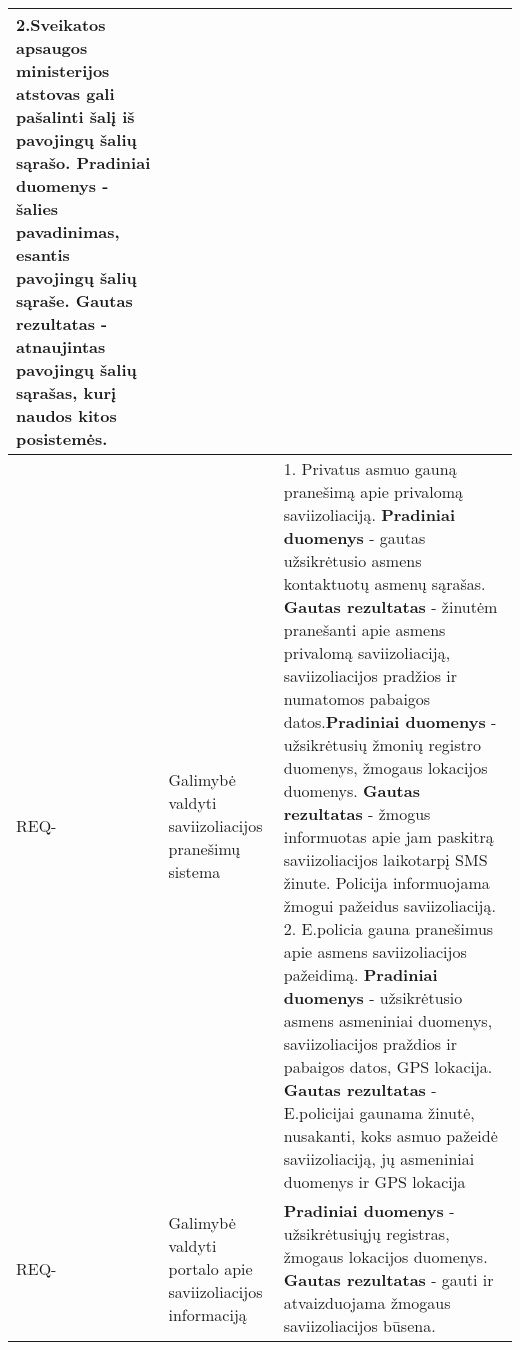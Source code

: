 \documentclass{VUMIFPSkursinis}
\newcounter{counter}
\newcommand{\reqCode}{%
	 \stepcounter{counter}%
	\color{blue} REQ-\thecounter}
\begin{document}
\begin{center}
\begin{longtable}{|C{2cm}|L{5cm}|L{8cm}|}
		{\color{blue} 2.Sveikatos apsaugos ministerijos atstovas gali pašalinti šalį iš pavojingų šalių sąrašo. \textbf{Pradiniai duomenys} - šalies pavadinimas, esantis pavojingų šalių sąraše. \textbf{Gautas rezultatas} - atnaujintas pavojingų šalių sąrašas, kurį naudos kitos posistemės.}                                                                                                                                                                                                                                                                                                                                                                                                                                                                                                             \\ \hline
		\reqCode                                                          &
		Galimybė valdyti saviizoliacijos pranešimų sistema                &
		{\color{blue} 1. Privatus asmuo gauną pranešimą apie privalomą saviizoliaciją. \textbf{Pradiniai duomenys} - gautas užsikrėtusio asmens kontaktuotų asmenų sąrašas. \textbf{Gautas rezultatas} - žinutėm pranešanti apie asmens privalomą saviizoliaciją, saviizoliacijos pradžios ir numatomos pabaigos datos.}\textbf{Pradiniai duomenys} - užsikrėtusių žmonių registro duomenys, žmogaus lokacijos duomenys. \textbf{Gautas rezultatas} - žmogus informuotas apie jam paskitrą saviizoliacijos laikotarpį SMS žinute. Policija informuojama žmogui pažeidus saviizoliaciją.
		{\color{blue} 2. E.policia gauna pranešimus apie asmens saviizoliacijos pažeidimą. \textbf{Pradiniai duomenys} - užsikrėtusio asmens asmeniniai duomenys, saviizoliacijos praždios ir pabaigos datos, GPS lokacija. \textbf{Gautas rezultatas} - E.policijai gaunama žinutė, nusakanti, koks asmuo pažeidė saviizoliaciją, jų asmeniniai duomenys ir GPS lokacija}                                                                                                                                                                                                                                                                                                                                                                                                                                     \\ \hline
		\reqCode                                                          &
		Galimybė valdyti portalo apie saviizoliacijos informaciją         &
		\textbf{Pradiniai duomenys} - užsikrėtusiųjų registras, žmogaus lokacijos duomenys. \textbf{Gautas rezultatas} - gauti ir atvaizduojama žmogaus saviizoliacijos būsena.

\end{longtable}
\end{center}
\end{document}
